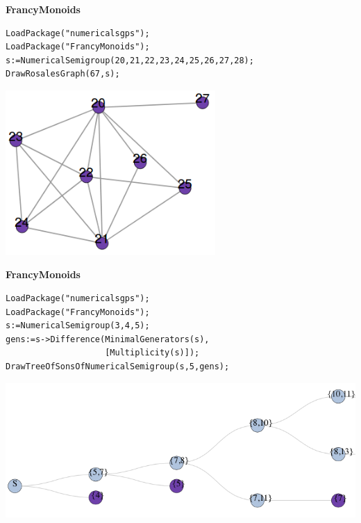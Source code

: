 \documentclass[10pt,compress]{beamer}
\begin{document}
\begin{frame}[fragile]
  \begin{center}
  {\color{ChetwodeBlue}\Large\textbf{FrancyMonoids}}    
  \end{center}
\begin{verbatim}
LoadPackage("numericalsgps");
LoadPackage("FrancyMonoids");
s:=NumericalSemigroup(20,21,22,23,24,25,26,27,28);
DrawRosalesGraph(67,s);
\end{verbatim}

\begin{center}
\includegraphics[width=0.6\textwidth]{./images/rosales.png}  
\end{center}
\end{frame}

\begin{frame}[fragile]
  \begin{center}
  {\color{ChetwodeBlue}\Large\textbf{FrancyMonoids}}    
  \end{center}
\begin{verbatim}
LoadPackage("numericalsgps");
LoadPackage("FrancyMonoids");
s:=NumericalSemigroup(3,4,5);
gens:=s->Difference(MinimalGenerators(s), 
                    [Multiplicity(s)]);
DrawTreeOfSonsOfNumericalSemigroup(s,5,gens);
\end{verbatim}

\begin{center}
\includegraphics[width=\textwidth]{./images/tree-semigroups.png}  
\end{center}
\end{frame}
\end{document}

